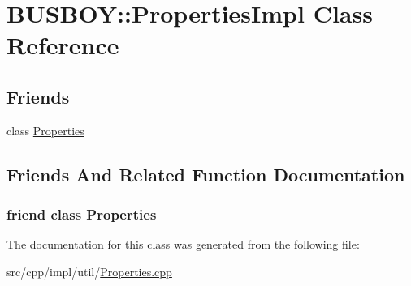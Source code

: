 \hypertarget{classBUSBOY_1_1PropertiesImpl}{
\section{BUSBOY::PropertiesImpl Class Reference}
\label{classBUSBOY_1_1PropertiesImpl}
}
\subsection*{Friends}
\begin{DoxyCompactItemize}
\item 
class \hyperlink{classBUSBOY_1_1PropertiesImpl_a07abafce4382a305ca01821acdae5cd9}{Properties}
\end{DoxyCompactItemize}


\subsection{Friends And Related Function Documentation}
\hypertarget{classBUSBOY_1_1PropertiesImpl_a07abafce4382a305ca01821acdae5cd9}{
\subsubsection[{Properties}]{\setlength{\rightskip}{0pt plus 5cm}friend class {\bf Properties}}}
\label{classBUSBOY_1_1PropertiesImpl_a07abafce4382a305ca01821acdae5cd9}


The documentation for this class was generated from the following file:\begin{DoxyCompactItemize}
\item 
src/cpp/impl/util/\hyperlink{Properties_8cpp}{Properties.cpp}\end{DoxyCompactItemize}
